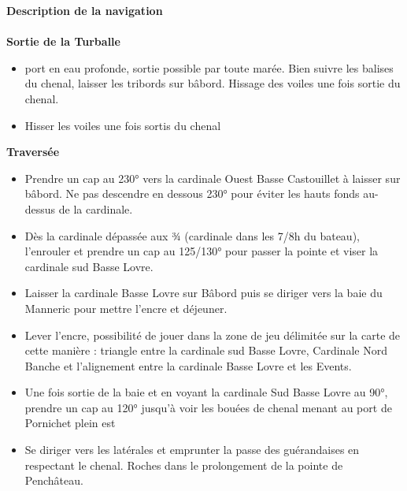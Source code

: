 \begin{minipage}[c][\textheight][t]{0.10\textwidth}
\hfill
\end{minipage}%
\begin{minipage}[c][\textheight][t]{0.50\textwidth}
    \vspace{4cm}
    \color{StrongBlue}    
    {\huge \textbf{Description de la navigation}}\\
        \vspace{0.1cm}\\
        {\large \textbf{Sortie de la Turballe}}\\    
            \begin{itemize}
                \itemsep0em 
                \item port en eau profonde, sortie possible par toute marée. Bien suivre les balises du chenal, laisser les tribords sur bâbord. Hissage des voiles une fois sortie du chenal.
                \item Hisser les voiles une fois sortis du chenal
            \end{itemize}
        {\large \textbf{Traversée}}\\
            \begin{itemize}
                \itemsep0em 
                \item Prendre un cap au 230° vers la cardinale Ouest Basse Castouillet à laisser sur bâbord. Ne pas descendre en dessous 230° pour éviter les hauts fonds au-dessus de la cardinale. 
                \item  Dès la cardinale dépassée aux ¾ (cardinale dans les 7/8h du bateau), l’enrouler et prendre un cap au 125/130° pour passer la pointe et viser la cardinale sud Basse Lovre. 
                \item Laisser la cardinale Basse Lovre sur Bâbord puis se diriger vers la baie du Manneric pour mettre l’encre et déjeuner. 
                \item Lever l’encre, possibilité de jouer dans la zone de jeu délimitée sur la carte de cette manière : triangle entre la cardinale sud Basse Lovre, Cardinale Nord Banche et l’alignement entre la cardinale Basse Lovre et les Events. 
                \item Une fois sortie de la baie et en voyant la cardinale Sud Basse Lovre au 90°, prendre un cap au 120° jusqu’à voir les bouées de chenal menant au port de Pornichet plein est
                \item Se diriger vers les latérales et emprunter la passe des guérandaises en respectant le chenal. Roches dans le prolongement de la pointe de Penchâteau. 

\end{itemize}
\end{minipage}
